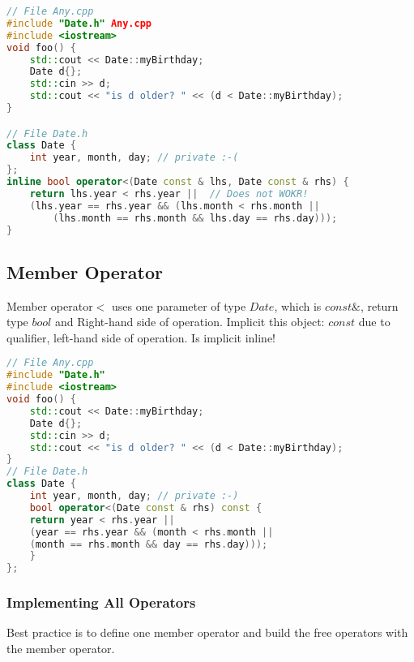\begin{lstlisting}[language=C++]
// File Any.cpp
#include "Date.h" Any.cpp
#include <iostream>
void foo() {
	std::cout << Date::myBirthday;
	Date d{};
	std::cin >> d;
	std::cout << "is d older? " << (d < Date::myBirthday); 
}

// File Date.h
class Date {
	int year, month, day; // private :-( 
};
inline bool operator<(Date const & lhs, Date const & rhs) {
	return lhs.year < rhs.year ||  // Does not WOKR!
	(lhs.year == rhs.year && (lhs.month < rhs.month ||
		(lhs.month == rhs.month && lhs.day == rhs.day)));
}
\end{lstlisting}

\subsection{Member Operator}
Member operator$<$ uses one parameter of type $Date$, which is $const \&$, return type $bool$ and Right-hand side of operation. Implicit this object: $const$ due to qualifier, left-hand side of operation. Is implicit inline!
\begin{lstlisting}[language=C++]
// File Any.cpp
#include "Date.h" 
#include <iostream>
void foo() {
	std::cout << Date::myBirthday;
	Date d{};
	std::cin >> d;
	std::cout << "is d older? " << (d < Date::myBirthday); 
}
// File Date.h
class Date {
	int year, month, day; // private :-)
	bool operator<(Date const & rhs) const {
	return year < rhs.year ||
	(year == rhs.year && (month < rhs.month ||
	(month == rhs.month && day == rhs.day)));
	} 
};
\end{lstlisting}

\subsubsection{Implementing All Operators}
Best practice is to define one member operator and build the free operators with the member operator.

